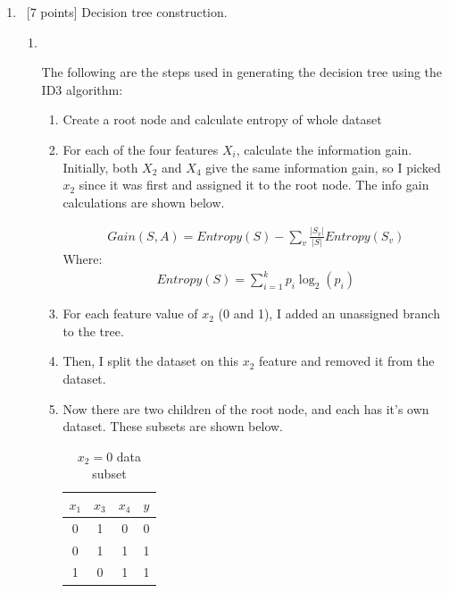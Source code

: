 \documentclass[12pt, fullpage,letterpaper]{article}
\begin{document}
\begin{enumerate}
\item~[7 points] Decision tree construction. 



\begin{enumerate}
\item~

The following are the steps used in generating the decision tree using the ID3 algorithm:

	\begin{enumerate}
		\item Create a root node and calculate entropy of whole dataset
		\item For each of the four features $X_i$, calculate the information gain. Initially, both $X_2$ and $X_4$ give the same information gain, so I picked $x_2$ since it was first and assigned it to the root node. The info gain calculations are shown below.
		
		\[
        	\begin{split}
        		Gain(S,A) = Entropy(S) - \sum_v \frac{|S_v|}{|S|} Entropy(S_v)
        	\end{split}
		\]
		Where:
		\[
        	\begin{split}
        		Entropy(S) = \sum_{i=1}^k p_i \log_2 (p_i)
        	\end{split}
		\]
		
		\item For each feature value of $x_2$ (0 and 1), I added an unassigned branch to the tree.
		\item Then, I split the dataset on this $x_2$ feature and removed it from the dataset.
		\item Now there are two children of the root node, and each has it's own dataset. These subsets are shown below.
		
		\begin{table}[h]
			\centering
			\begin{tabular}{ccc|c}
				$x_1$  & $x_3$ & $x_4$ & $y$\\ 
				\hline\hline
				0 & 1 & 0 & 0 \\ \hline
				0 & 1 & 1 & 1 \\ \hline
				1 & 0 & 1 & 1 \\ \hline
	
			\end{tabular}
			\caption{$x_2=0$ data subset}
		
		\end{table}
		

\end{enumerate}
\end{enumerate}
\end{enumerate}
\end{document}

